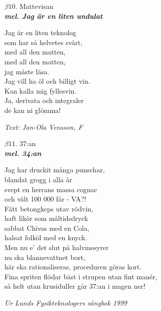 \documentclass[a6paper,10pt]{article}
\newcommand{\mel}[1]{\small\textbf{\textit{mel. #1 \\}}}
\begin{document}
\setlength{\oddsidemargin}{-0.47in}
\begin{center}
\Large $\beta10$. Mattevisan \\ 
\mel{Jag är en liten undulat}
\end{center}
Jag är en liten teknolog\\
som har så helvetes svårt,\\
med all den matten,\\
med all den matten,\\
jag måste läsa.
\vspace{5pt} \\
Jag vill ha öl och billigt vin.\\
Kan kalla mig fyllesvin.\\
Ja, derivata och integraler\\
de kan ni glömma!
\begin{flushright}
\textit{Text: Jan-Ola Vensson, F}
\end{flushright}
\vspace{-10pt}
\begin{center}
\Large $\beta11$. 37:an \\ 
\mel{34:an}
\end{center}
Jag har druckit många punschar,\\
 blandat grogg i alla år\\
svept en herrans massa cognac\\
 och vält 100 000 får - VA?!\\
Fått betongkeps utav rödvin,\\
 haft likör som måltidsdryck\\
sabbat Chivas med en Cola, \\
halsat folköl med en knyck.
\vspace{5pt} \\
Men nu e' det slut på halvmesyrer\\
 nu ska blannevattnet bort,\\
här ska rationaliseras, proceduren göras kort.\\
Fina spriten flödar bäst i strupen utan fint manér,\\
så helt utan krusiduller går 37:an i magen ner!
\begin{flushright}
\textit{Ur Lunds Fysikteknologers sångbok 1999}
\end{flushright}
\end{document}
